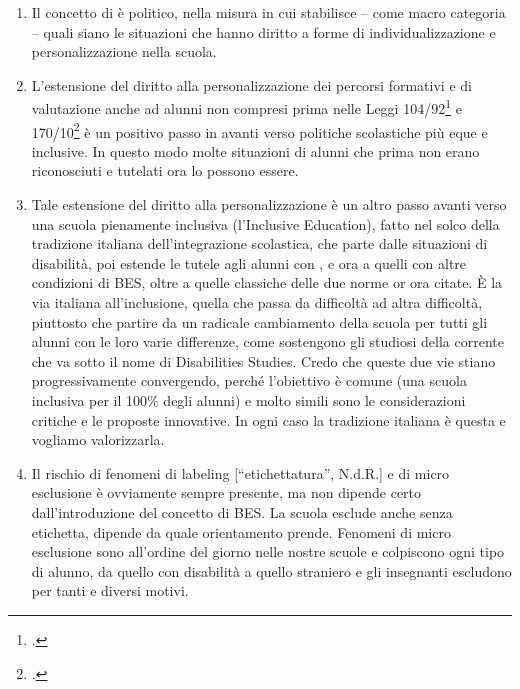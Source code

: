 \begin{enumerate}
	\item Il concetto di   è politico, nella misura in cui stabilisce – come macro categoria – quali siano le situazioni che hanno diritto a forme di individualizzazione e personalizzazione nella scuola.
	\item L'estensione del diritto alla personalizzazione dei percorsi formativi e di valutazione anche ad alunni non compresi prima nelle Leggi 104/92\footcite{Legge_104_92} e 170/10\footcite{legge170} è un positivo passo in avanti verso politiche scolastiche più eque e inclusive. In questo modo molte situazioni di alunni che prima non erano riconosciuti e tutelati ora lo possono essere.
	\item Tale estensione del diritto alla personalizzazione è un altro passo avanti verso una scuola pienamente inclusiva (l'Inclusive Education), fatto nel solco della tradizione italiana dell'integrazione scolastica, che parte dalle situazioni di disabilità, poi estende le tutele agli alunni con , e ora a quelli con altre condizioni di BES, oltre a quelle classiche delle due norme or ora citate.
	È la via italiana all'inclusione, quella che passa da difficoltà ad altra difficoltà, piuttosto che partire da un radicale cambiamento della scuola per tutti gli alunni con le loro varie differenze, come sostengono gli studiosi della corrente che va sotto il nome di Disabilities Studies. Credo che queste due vie stiano progressivamente convergendo, perché l'obiettivo è comune (una scuola inclusiva per il 100\% degli alunni) e molto simili sono le considerazioni critiche e le proposte innovative. In ogni caso la tradizione italiana è questa e vogliamo valorizzarla.
	\item Il rischio di fenomeni di labeling [“etichettatura”, N.d.R.] e di micro esclusione è ovviamente sempre presente, ma non dipende certo dall'introduzione del concetto di BES. La scuola esclude anche senza etichetta, dipende da quale orientamento prende. Fenomeni di micro esclusione sono all'ordine del giorno nelle nostre scuole e colpiscono ogni tipo di alunno, da quello con disabilità a quello straniero e gli insegnanti escludono per tanti e diversi motivi.
	

\end{enumerate}
